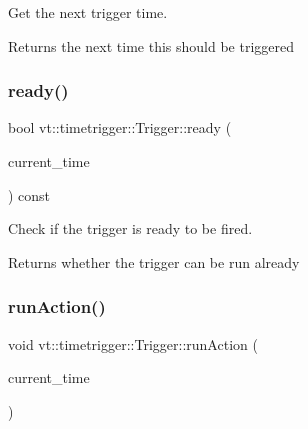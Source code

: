 Get the next trigger time. 

\begin{DoxyReturn}{Returns}
the next time this should be triggered 
\end{DoxyReturn}
\mbox{\label{structvt_1_1timetrigger_1_1_trigger_af00027850254b42fbcc2f5fde829b386}} 
\subsubsection{\texorpdfstring{ready()}{ready()}}
{\footnotesize\ttfamily bool vt\+::timetrigger\+::\+Trigger\+::ready (\begin{DoxyParamCaption}\item[{\hyperlink{namespacevt_a876a9d0cd5a952859c72de8a46881442}{Time\+Type}}]{current\+\_\+time }\end{DoxyParamCaption}) const\hspace{0.3cm}{\ttfamily [inline]}}



Check if the trigger is ready to be fired. 

\begin{DoxyReturn}{Returns}
whether the trigger can be run already 
\end{DoxyReturn}
\mbox{\label{structvt_1_1timetrigger_1_1_trigger_a44688f64be94b9c821768b55a3a236f7}} 
\subsubsection{\texorpdfstring{run\+Action()}{runAction()}}
{\footnotesize\ttfamily void vt\+::timetrigger\+::\+Trigger\+::run\+Action (\begin{DoxyParamCaption}\item[{\hyperlink{namespacevt_a876a9d0cd5a952859c72de8a46881442}{Time\+Type}}]{current\+\_\+time }\end{DoxyParamCaption})\hspace{0.3cm}{\ttfamily [inline]}}




